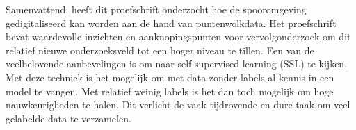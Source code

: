 Samenvattend, heeft dit proefschrift onderzocht hoe de spooromgeving gedigitaliseerd kan worden aan de hand van puntenwolkdata. Het proefschrift bevat waardevolle inzichten en aanknopingspunten voor vervolgonderzoek om dit relatief nieuwe onderzoeksveld tot een hoger niveau te tillen. Een van de veelbelovende aanbevelingen is om naar self-supervised learning (SSL) te kijken. Met deze techniek is het mogelijk om met data zonder labels al kennis in een model te vangen. Met relatief weinig labels is het dan toch mogelijk om hoge nauwkeurigheden te halen. Dit verlicht de vaak tijdrovende en dure taak om veel gelabelde data te verzamelen.